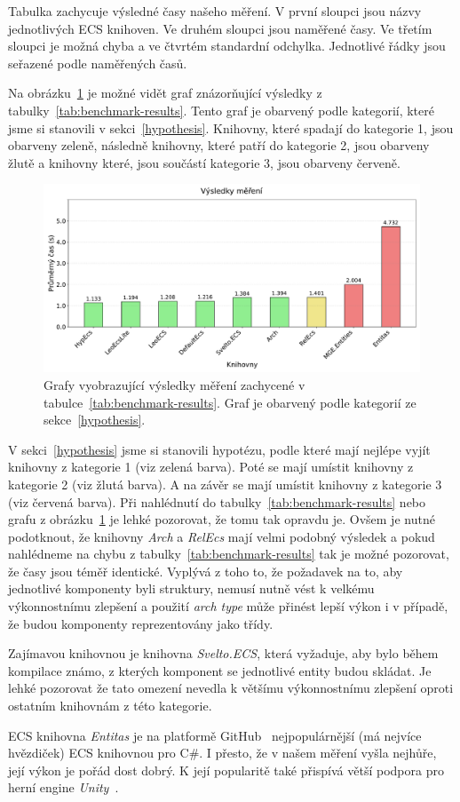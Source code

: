 Tabulka zachycuje výsledné časy našeho měření. V první sloupci jsou názvy jednotlivých ECS knihoven. Ve druhém sloupci jsou naměřené časy. Ve třetím sloupci je možná chyba a ve čtvrtém standardní odchylka. Jednotlivé řádky jsou seřazené podle naměřených časů.

Na obrázku~\ref{fig:benchmark-results} je možné vidět graf znázorňující výsledky z tabulky~\ref{tab:benchmark-results}. Tento graf je obarvený podle kategorií, které jsme si stanovili v sekci~\ref{hypothesis}. Knihovny, které spadají do kategorie 1, jsou obarveny zeleně, následně knihovny, které patří do kategorie 2, jsou obarveny žlutě a knihovny které, jsou součástí kategorie 3, jsou obarveny červeně.

\begin{figure}[!htb]
    \centering
    \includegraphics[width=1.0\linewidth]{plots/benchmark_results.pdf}
    \caption{Grafy vyobrazující výsledky měření zachycené v tabulce~\ref{tab:benchmark-results}. Graf je obarvený podle kategorií ze sekce~\ref{hypothesis}.}
    \label{fig:benchmark-results}
\end{figure}

V sekci~\ref{hypothesis} jsme si stanovili hypotézu, podle které mají nejlépe vyjít knihovny z kategorie 1 (viz zelená barva). Poté se mají umístit knihovny z kategorie 2 (viz žlutá barva). A na závěr se mají umístit knihovny z kategorie 3 (viz červená barva). Při nahlédnutí do tabulky~\ref{tab:benchmark-results} nebo grafu z obrázku~\ref{fig:benchmark-results} je lehké pozorovat, že tomu tak opravdu je. Ovšem je nutné podotknout, že knihovny \textit{Arch} a \textit{RelEcs} mají velmi podobný výsledek a pokud nahlédneme na chybu z tabulky~\ref{tab:benchmark-results} tak je možné pozorovat, že časy jsou téměř identické. Vyplývá z toho to, že požadavek na to, aby jednotlivé komponenty byli struktury, nemusí nutně vést k velkému výkonnostnímu zlepšení a použití \textit{arch type} může přinést lepší výkon i v případě, že budou komponenty reprezentovány jako třídy.

Zajímavou knihovnou je knihovna \textit{Svelto.ECS}, která vyžaduje, aby bylo během kompilace známo, z kterých komponent se jednotlivé entity budou skládat. Je lehké pozorovat že tato omezení nevedla k většímu výkonnostnímu zlepšení oproti ostatním knihovnám z této kategorie.

ECS knihovna \textit{Entitas} je na platformě GitHub~\cite{GitHub} nejpopulárnější (má nejvíce hvězdiček) ECS knihovnou pro C\#. I přesto, že v našem měření vyšla nejhůře, její výkon je pořád dost dobrý. K její popularitě také přispívá větší podpora pro herní engine \textit{Unity}~\cite{Unity}.